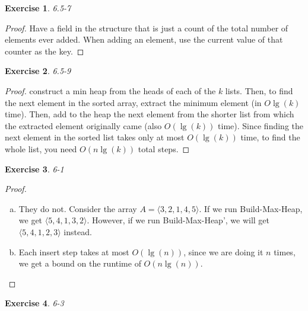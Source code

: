 \documentclass{article}
\newtheorem{th1}{Exercise}
\begin{document}
\begin{th1}\label{ex16}
6.5-7
\end{th1}
\begin{proof}
Have a field in the structure that is just a count of the total number of elements ever added. When adding an element, use the current value of that counter as the key.
\end{proof}
\begin{th1}\label{ex17}
6.5-9
\end{th1}
\begin{proof}
construct a min heap from the heads of each of the $k$ lists. Then, to find the next element in the sorted array, extract the minimum element (in $O\lg(k)$ time). Then, add to the heap the next element from the shorter list from which the extracted element originally came (also $O(\lg(k))$ time). Since finding the next element in the sorted list takes only at most $O(\lg(k))$ time, to find the whole list, you need $O(n\lg(k))$ total steps. 
\end{proof}
\begin{th1}\label{ex18}
6-1
\end{th1}
\begin{proof}
\begin{enumerate}[a.]
\item
They do not. Consider the array $A =\langle 3,2,1,4,5\rangle$. If we run Build-Max-Heap, we get $\langle 5,4,1,3,2\rangle$. However, if we run Build-Max-Heap', we will get $\langle 5,4,1,2,3\rangle$ instead.
\item
Each insert step takes at most $O(\lg(n))$, since we are doing it $n$ times, we get a bound on the runtime of $O(n\lg(n))$.
\end{enumerate}
\end{proof}
\begin{th1}\label{ex19}
6-3
\end{th1}
\end{document}

